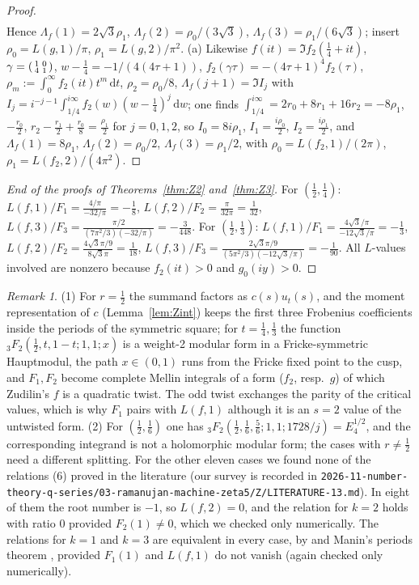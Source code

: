 \documentclass[11pt]{amsart}
\theoremstyle{definition}
\theoremstyle{remark}
\newtheorem{remark}[theorem]{Remark}
\numberwithin{equation}{section}
\newcommand{\dd}{\,\mathrm{d}}
\newcommand{\file}[1]{\nolinkurl{2026-11-number-theory-q-series/03-ramanujan-machine-zeta5/#1}}
\begin{document}
\begin{proof}
\begin{align*}
\end{align*}
Hence $\Lambda_f(1)=2\sqrt3\rho_1$, $\Lambda_f(2)=\rho_0/(3\sqrt3)$, $\Lambda_f(3)=\rho_1/(6\sqrt3)$; insert $\rho_0=L(g,1)/\pi$, $\rho_1=L(g,2)/\pi^2$.
(a) Likewise $f(it)=\Im f_2(\frac14+it)$, $\gamma=\begin{psmallmatrix}1&0\\4&1\end{psmallmatrix}$, $w-\frac14=-1/(4(4\tau+1))$, $f_2(\gamma\tau)=-(4\tau+1)^4f_2(\tau)$, $\rho_m:=\int_0^\infty f_2(it)t^m\dd t$, $\rho_2=\rho_0/8$, $\Lambda_f(j+1)=\Im I_j$ with $I_j=i^{-j-1}\int_{1/4}^{i\infty}f_2(w)(w-\frac14)^j\dd w$; one finds $\int_{1/4}^{i\infty}=2r_0+8r_1+16r_2=-8\rho_1$, $-\frac{r_0}2$, $r_2-\frac{r_1}2+\frac{r_0}8=\frac{\rho_1}2$ for $j=0,1,2$, so $I_0=8i\rho_1$, $I_1=\frac{i\rho_0}2$, $I_2=\frac{i\rho_1}2$, and $\Lambda_f(1)=8\rho_1$, $\Lambda_f(2)=\rho_0/2$, $\Lambda_f(3)=\rho_1/2$, with $\rho_0=L(f_2,1)/(2\pi)$, $\rho_1=L(f_2,2)/(4\pi^2)$.
\end{proof}

\begin{proof}[End of the proofs of Theorems~\ref{thm:Z2} and~\ref{thm:Z3}]
For $(\frac12,\frac14)$: $L(f,1)/F_1=\frac{4/\pi}{-32/\pi}=-\frac18$, $L(f,2)/F_2=\frac\pi{32\pi}=\frac1{32}$, $L(f,3)/F_3=\frac{\pi/2}{(7\pi^2/3)(-32/\pi)}=-\frac3{448}$. For $(\frac12,\frac13)$: $L(f,1)/F_1=\frac{4\sqrt3/\pi}{-12\sqrt3/\pi}=-\frac13$, $L(f,2)/F_2=\frac{4\sqrt3\pi/9}{8\sqrt3\pi}=\frac1{18}$, $L(f,3)/F_3=\frac{2\sqrt3\pi/9}{(5\pi^2/3)(-12\sqrt3/\pi)}=-\frac1{90}$. All $L$-values involved are nonzero because $f_2(it)>0$ and $g_0(iy)>0$.
\end{proof}

\begin{remark}
(1) For $r=\frac12$ the summand factors as $c(s)u_t(s)$, and the moment representation of $c$ (Lemma~\ref{lem:Zint}) keeps the first three Frobenius coefficients inside the periods of the symmetric square; for $t=\frac14,\frac13$ the function ${}_3F_2(\frac12,t,1-t;1,1;x)$ is a weight-2 modular form in a Fricke-symmetric Hauptmodul, the path $x\in(0,1)$ runs from the Fricke fixed point to the cusp, and $F_1,F_2$ become complete Mellin integrals of a form ($f_2$, resp.\ $g$) of which Zudilin's $f$ is a quadratic twist. The odd twist exchanges the parity of the critical values, which is why $F_1$ pairs with $L(f,1)$ although it is an $s=2$ value of the untwisted form.
(2) For $(\frac12,\frac16)$ one has ${}_3F_2(\frac12,\frac16,\frac56;1,1;1728/j)=E_4^{1/2}$, and the corresponding integrand is not a holomorphic modular form; the cases with $r\ne\frac12$ need a different splitting. For the other eleven cases we found none of the relations (6) proved in the literature (our survey is recorded in \file{Z/LITERATURE-13.md}). In eight of them the root number is $-1$, so $L(f,2)=0$, and the relation for $k=2$ holds with ratio $0$ provided $F_2(1)\neq0$, which we checked only numerically. The relations for $k=1$ and $k=3$ are equivalent in every case, by \cite[Remark~5]{Zud} and Manin's periods theorem \cite{Man}, provided $F_1(1)$ and $L(f,1)$ do not vanish (again checked only numerically).
\end{remark}
\end{document}
